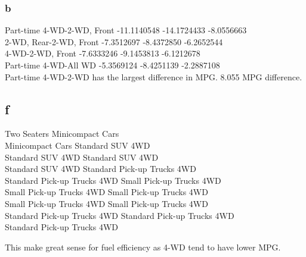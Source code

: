 \documentclass[10pt,letterpaper]{article}
\begin{document}
\subsubsection*{b}
Part-time 4-WD-2-WD, Front -11.1140548 -14.1724433 -8.0556663\\
2-WD, Rear-2-WD, Front      -7.3512697  -8.4372850 -6.2652544\\
4-WD-2-WD, Front            -7.6333246  -9.1453813 -6.1212678\\
Part-time 4-WD-All WD       -5.3569124  -8.4251139 -2.2887108\\

Part-time 4-WD-2-WD has the largest difference in MPG. 8.055 MPG difference.
\subsection*{f}
Two Seaters                 Minicompact Cars\\
Minicompact Cars            Standard SUV 4WD  \\         
Standard SUV 4WD            Standard SUV 4WD    \\      
Standard SUV 4WD            Standard Pick-up Trucks 4WD\\
Standard Pick-up Trucks 4WD Small Pick-up Trucks 4WD   \\
Small Pick-up Trucks 4WD    Small Pick-up Trucks 4WD   \\
Small Pick-up Trucks 4WD    Small Pick-up Trucks 4WD   \\
Standard Pick-up Trucks 4WD Standard Pick-up Trucks 4WD\\
Standard Pick-up Trucks 4WD


This make great sense for fuel efficiency as 4-WD tend to have lower MPG. 
\end{document}
